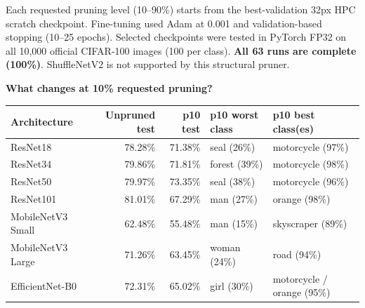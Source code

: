 Each requested pruning level (10--90\%) starts from the best-validation 32px HPC scratch checkpoint. Fine-tuning used Adam at 0.001 and validation-based stopping (10--25 epochs). Selected checkpoints were tested in PyTorch FP32 on all 10,000 official CIFAR-100 images (100 per class). \textbf{All 63 runs are complete (100\%)}. ShuffleNetV2 is not supported by this structural pruner.

\textbf{What changes at 10\% requested pruning?}
\vspace{-4pt}\begin{center}\small\setlength{\tabcolsep}{5pt}
\begin{tabularx}{\linewidth}{@{}lrrXX@{}}\toprule
Architecture & Unpruned test & p10 test & p10 worst class & p10 best class(es)\\
\midrule
ResNet18 & 78.28\% & 71.38\% & seal (26\%) & motorcycle (97\%)\\
ResNet34 & 79.86\% & 71.81\% & forest (39\%) & motorcycle (98\%)\\
ResNet50 & 79.97\% & 73.35\% & seal (38\%) & motorcycle (96\%)\\
ResNet101 & 81.01\% & 67.29\% & man (27\%) & orange (98\%)\\
MobileNetV3 Small & 62.48\% & 55.48\% & man (15\%) & skyscraper (89\%)\\
MobileNetV3 Large & 71.26\% & 63.45\% & woman (24\%) & road (94\%)\\
EfficientNet-B0 & 72.31\% & 65.02\% & girl (30\%) & motorcycle / orange (95\%)\\
\bottomrule\end{tabularx}
\end{center}\vspace{-4pt}

